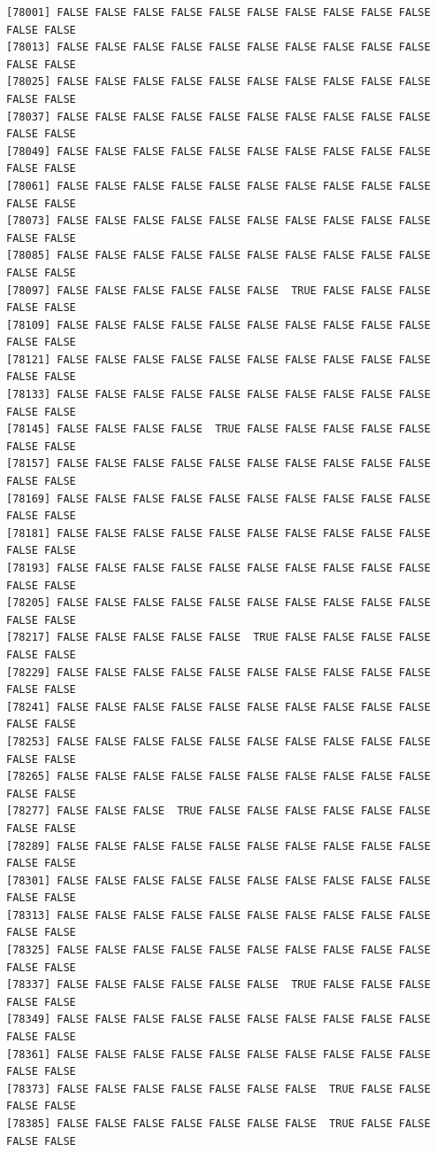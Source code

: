 \documentclass[
  a4paper,
  DIV=11,
  numbers=noendperiod]{scrartcl}
\begin{document}
\begin{verbatim}
[78001] FALSE FALSE FALSE FALSE FALSE FALSE FALSE FALSE FALSE FALSE FALSE FALSE
[78013] FALSE FALSE FALSE FALSE FALSE FALSE FALSE FALSE FALSE FALSE FALSE FALSE
[78025] FALSE FALSE FALSE FALSE FALSE FALSE FALSE FALSE FALSE FALSE FALSE FALSE
[78037] FALSE FALSE FALSE FALSE FALSE FALSE FALSE FALSE FALSE FALSE FALSE FALSE
[78049] FALSE FALSE FALSE FALSE FALSE FALSE FALSE FALSE FALSE FALSE FALSE FALSE
[78061] FALSE FALSE FALSE FALSE FALSE FALSE FALSE FALSE FALSE FALSE FALSE FALSE
[78073] FALSE FALSE FALSE FALSE FALSE FALSE FALSE FALSE FALSE FALSE FALSE FALSE
[78085] FALSE FALSE FALSE FALSE FALSE FALSE FALSE FALSE FALSE FALSE FALSE FALSE
[78097] FALSE FALSE FALSE FALSE FALSE FALSE  TRUE FALSE FALSE FALSE FALSE FALSE
[78109] FALSE FALSE FALSE FALSE FALSE FALSE FALSE FALSE FALSE FALSE FALSE FALSE
[78121] FALSE FALSE FALSE FALSE FALSE FALSE FALSE FALSE FALSE FALSE FALSE FALSE
[78133] FALSE FALSE FALSE FALSE FALSE FALSE FALSE FALSE FALSE FALSE FALSE FALSE
[78145] FALSE FALSE FALSE FALSE  TRUE FALSE FALSE FALSE FALSE FALSE FALSE FALSE
[78157] FALSE FALSE FALSE FALSE FALSE FALSE FALSE FALSE FALSE FALSE FALSE FALSE
[78169] FALSE FALSE FALSE FALSE FALSE FALSE FALSE FALSE FALSE FALSE FALSE FALSE
[78181] FALSE FALSE FALSE FALSE FALSE FALSE FALSE FALSE FALSE FALSE FALSE FALSE
[78193] FALSE FALSE FALSE FALSE FALSE FALSE FALSE FALSE FALSE FALSE FALSE FALSE
[78205] FALSE FALSE FALSE FALSE FALSE FALSE FALSE FALSE FALSE FALSE FALSE FALSE
[78217] FALSE FALSE FALSE FALSE FALSE  TRUE FALSE FALSE FALSE FALSE FALSE FALSE
[78229] FALSE FALSE FALSE FALSE FALSE FALSE FALSE FALSE FALSE FALSE FALSE FALSE
[78241] FALSE FALSE FALSE FALSE FALSE FALSE FALSE FALSE FALSE FALSE FALSE FALSE
[78253] FALSE FALSE FALSE FALSE FALSE FALSE FALSE FALSE FALSE FALSE FALSE FALSE
[78265] FALSE FALSE FALSE FALSE FALSE FALSE FALSE FALSE FALSE FALSE FALSE FALSE
[78277] FALSE FALSE FALSE  TRUE FALSE FALSE FALSE FALSE FALSE FALSE FALSE FALSE
[78289] FALSE FALSE FALSE FALSE FALSE FALSE FALSE FALSE FALSE FALSE FALSE FALSE
[78301] FALSE FALSE FALSE FALSE FALSE FALSE FALSE FALSE FALSE FALSE FALSE FALSE
[78313] FALSE FALSE FALSE FALSE FALSE FALSE FALSE FALSE FALSE FALSE FALSE FALSE
[78325] FALSE FALSE FALSE FALSE FALSE FALSE FALSE FALSE FALSE FALSE FALSE FALSE
[78337] FALSE FALSE FALSE FALSE FALSE FALSE  TRUE FALSE FALSE FALSE FALSE FALSE
[78349] FALSE FALSE FALSE FALSE FALSE FALSE FALSE FALSE FALSE FALSE FALSE FALSE
[78361] FALSE FALSE FALSE FALSE FALSE FALSE FALSE FALSE FALSE FALSE FALSE FALSE
[78373] FALSE FALSE FALSE FALSE FALSE FALSE FALSE  TRUE FALSE FALSE FALSE FALSE
[78385] FALSE FALSE FALSE FALSE FALSE FALSE FALSE  TRUE FALSE FALSE FALSE FALSE

\end{verbatim}
\end{document}
